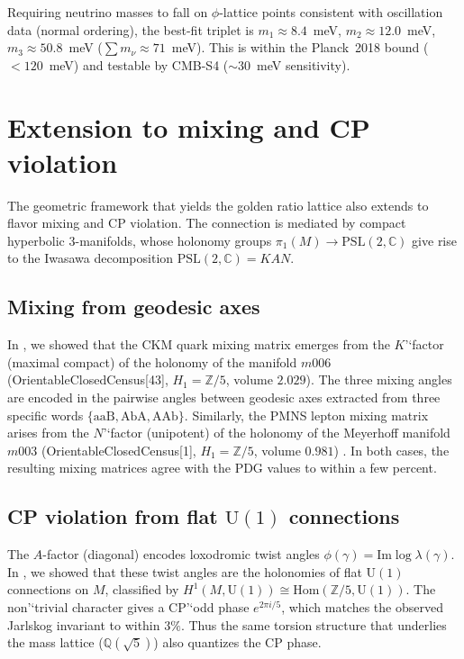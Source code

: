 ﻿\documentclass[12pt]{article}
\theoremstyle{definition}
\begin{document}
Requiring neutrino masses to fall on $\phi$-lattice points consistent
with oscillation data (normal ordering), the best-fit triplet is
$m_1\approx8.4$~meV, $m_2\approx12.0$~meV, $m_3\approx50.8$~meV
($\sum m_\nu\approx71$~meV). This is within the Planck~2018 bound
($<120$~meV) and testable by CMB-S4 ($\sim30$~meV sensitivity).

\section{Extension to mixing and CP violation}




\label{sec:mixing_cp}

The geometric framework that yields the golden ratio lattice also extends to flavor mixing and CP violation. The connection is mediated by compact hyperbolic 3-manifolds, whose holonomy groups $\pi_1(M)\to\mathrm{PSL}(2,\mathbb{C})$ give rise to the Iwasawa decomposition $\mathrm{PSL}(2,\mathbb{C}) = KAN$.

\subsection{Mixing from geodesic axes}
In \cite{Gentry:CKM}, we showed that the CKM quark mixing matrix emerges from the $K$'`factor (maximal compact) of the holonomy of the manifold $m006$ (OrientableClosedCensus[43], $H_1=\mathbb{Z}/5$, volume $2.029$). The three mixing angles are encoded in the pairwise angles between geodesic axes extracted from three specific words $\{\mathrm{aaB},\mathrm{AbA},\mathrm{AAb}\}$. Similarly, the PMNS lepton mixing matrix arises from the $N$'`factor (unipotent) of the holonomy of the Meyerhoff manifold $m003$ (OrientableClosedCensus[1], $H_1=\mathbb{Z}/5$, volume $0.981$) \cite{Gentry:PMNS}. In both cases, the resulting mixing matrices agree with the PDG values to within a few percent.

\subsection{CP violation from flat $\mathrm{U}(1)$ connections}
The $A$-factor (diagonal) encodes loxodromic twist angles $\phi(\gamma)=\mathrm{Im}\log\lambda(\gamma)$. In \cite{Gentry:CP}, we showed that these twist angles are the holonomies of flat $\mathrm{U}(1)$ connections on $M$, classified by $H^1(M,\mathrm{U}(1))\cong\mathrm{Hom}(\mathbb{Z}/5,\mathrm{U}(1))$. The non'`trivial character gives a CP'`odd phase $e^{2\pi i/5}$, which matches the observed Jarlskog invariant to within $3\%$. Thus the same torsion structure that underlies the mass lattice ($\mathbb{Q}(\sqrt5)$) also quantizes the CP phase.
\end{document}
